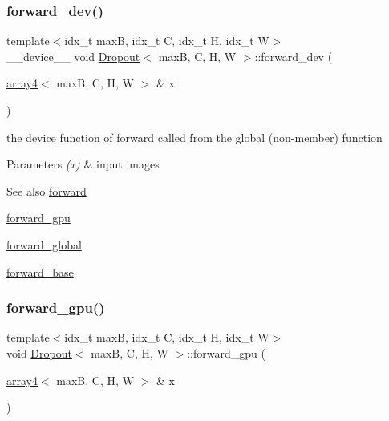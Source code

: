 \subsubsection{\texorpdfstring{forward\+\_\+dev()}{forward\_dev()}}
{\footnotesize\ttfamily template$<$idx\+\_\+t maxB, idx\+\_\+t C, idx\+\_\+t H, idx\+\_\+t W$>$ \\
\+\_\+\+\_\+device\+\_\+\+\_\+ void \hyperlink{structDropout}{Dropout}$<$ maxB, C, H, W $>$\+::forward\+\_\+dev (\begin{DoxyParamCaption}\item[{\hyperlink{structarray4}{array4}$<$ maxB, C, H, W $>$ \&}]{x }\end{DoxyParamCaption})\hspace{0.3cm}{\ttfamily [inline]}}



the device function of forward called from the global (non-\/member) function 


\begin{DoxyParams}{Parameters}
{\em (x)} & input images \\
\hline
\end{DoxyParams}
\begin{DoxySeeAlso}{See also}
\hyperlink{structDropout_a155eb3ad77df591bdd95645fec1f2089}{forward} 

\hyperlink{structDropout_a3bb7569a99e88c36e508bee45f379fad}{forward\+\_\+gpu} 

\hyperlink{softmaxcrossentropy_8h_a578aeeb166bd06e800d9b396eab48b35}{forward\+\_\+global} 

\hyperlink{structDropout_a8d7db70a48a4c2e3887c931b099f1160}{forward\+\_\+base} 
\end{DoxySeeAlso}
\mbox{\label{structDropout_a3bb7569a99e88c36e508bee45f379fad}} 
\subsubsection{\texorpdfstring{forward\+\_\+gpu()}{forward\_gpu()}}
{\footnotesize\ttfamily template$<$idx\+\_\+t maxB, idx\+\_\+t C, idx\+\_\+t H, idx\+\_\+t W$>$ \\
void \hyperlink{structDropout}{Dropout}$<$ maxB, C, H, W $>$\+::forward\+\_\+gpu (\begin{DoxyParamCaption}\item[{\hyperlink{structarray4}{array4}$<$ maxB, C, H, W $>$ \&}]{x }\end{DoxyParamCaption})\hspace{0.3cm}{\ttfamily [inline]}}



